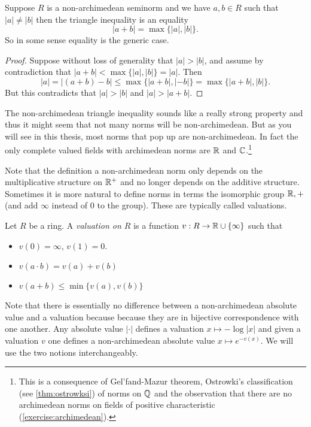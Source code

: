 \begin{lemma}
	Suppose $R$ is a non-archimedean seminorm and we have $a, b \in R$ such that $|a| \ne |b|$ then the triangle inequality is an equality \[
	|a + b| = \max \{|a|, |b|\} 
	.\] 
	So in some sense equality is the generic case. 
\end{lemma}
\begin{proof}
	Suppose without loss of generality that  $|a| > |b|$, and assume by contradiction that $|a + b| < \max \{|a|, |b|\}  = |a|$. 
	Then \[
		|a| = |(a + b) - b| \le \max \{|a + b|, |- b|\} = \max \{|a + b|, |b|\}  
	.\] 
	But this contradicts that $|a| > |b|$ and $|a| > |a + b| $. 
\end{proof}
The non-archimedean triangle inequality sounds like a really strong property and thus it might seem that not many norms will be non-archimedean. 
But as you will see in this thesis, most norms that pop up are non-archimedean. 
In fact the only complete valued fields with archimedean norms are $\mathbb{R}$ and $\mathbb{C}$.\footnote{This is a consequence of Gel'fand-Mazur theorem, Ostrowki's classification (see \cref{thm:ostrowksi}) of norms on $\mathbb{Q}$ and the observation that there are no archimedean norms on fields of positive characteristic (\cref{exercise:archimedean}).}



Note that the definition a non-archimedean norm only depends on the multiplicative structure on $\mathbb{R}^{+}$ and no longer depends on the additive structure. 
Sometimes it is more natural to define norms in terms the isomorphic group $\mathbb{R}, +$ (and add $\infty$ instead of $0$ to the group). 
These are typically called valuations. 


\begin{definition}
	Let $R$ be a ring. A \emph{valuation on $R$} is a function $v:R \to \mathbb{R} \cup \{\infty\} $ such that 	
	\begin{itemize}
		\item $v(0) = \infty$, $v(1) = 0$. 
		\item $v(a\cdot b) = v(a) + v(b)$
		\item $v(a + b) \le \min\{v(a), v(b)\}$
	\end{itemize}
\end{definition}

\begin{remark}
	Note that there is essentially no difference between a non-archimedean absolute value and a valuation because because they are in bijective correspondence with one another.  Any absolute value $|\cdot |$ defines a valuation $x \mapsto -\log |x|$ and given a valuation $v$ one defines a non-archimedean absolute value $x\mapsto e^{- v(x)}$. 
	We will use the two notions interchangeably. 
\end{remark}


